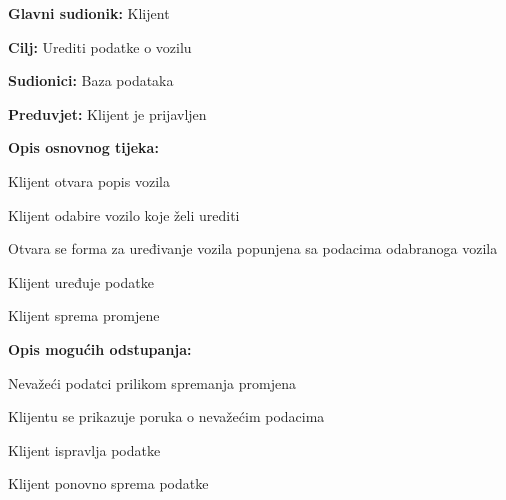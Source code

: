 \noindent {}
\begin{packed_item}
	
	\item \textbf{Glavni sudionik:} Klijent
	\item \textbf{Cilj:} Urediti podatke o vozilu
	\item \textbf{Sudionici:} Baza podataka
	\item \textbf{Preduvjet:} Klijent je prijavljen
	\item \textbf{Opis osnovnog tijeka:}
	
	\item[] \begin{packed_enum}
		
		\item Klijent otvara popis vozila
		\item Klijent odabire vozilo koje želi urediti
		\item Otvara se forma za uređivanje vozila popunjena sa podacima odabranoga vozila
		\item Klijent uređuje podatke
		\item Klijent sprema promjene
	
	\end{packed_enum}
	
	\item  \textbf{Opis mogućih odstupanja:}
	
	\item[] \begin{packed_item}
		
		\item[6.a] Nevažeći podatci prilikom spremanja promjena
		\item[] \begin{packed_enum}
			
			\item Klijentu se prikazuje poruka o nevažećim podacima
			\item Klijent ispravlja podatke
			\item Klijent ponovno sprema podatke
			
		\end{packed_enum}
		
	\end{packed_item}

\end{packed_item}

